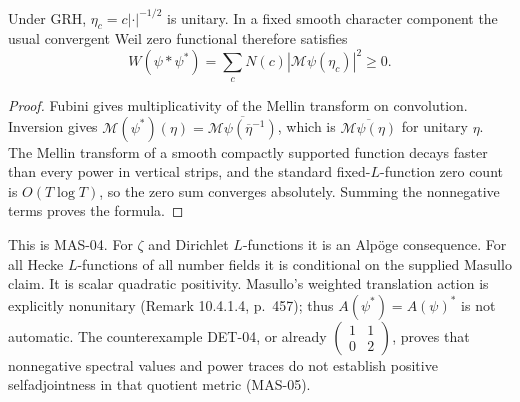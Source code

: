 \documentclass[11pt,a4paper]{article}
\newcommand{\M}{\mathcal M}
\newcommand{\fid}[1]{\textsf{#1}}
\begin{document}
Under GRH, $\eta_c=c|\cdot|^{-1/2}$ is unitary. In a fixed smooth character component the usual convergent Weil zero functional therefore satisfies
\begin{equation}\label{eq:weilsquares}
 W(\psi*\psi^*)=\sum_cN(c)|\M\psi(\eta_c)|^2\ge0.
\end{equation}
\begin{proof}
Fubini gives multiplicativity of the Mellin transform on convolution. Inversion gives
$\M(\psi^*)(\eta)=\overline{\M\psi(\overline\eta^{-1})}$, which is $\overline{\M\psi(\eta)}$ for unitary $\eta$. The Mellin transform of a smooth compactly supported function decays faster than every power in vertical strips, and the standard fixed-$L$-function zero count is $O(T\log T)$, so the zero sum converges absolutely. Summing the nonnegative terms proves the formula.
\end{proof}
This is \fid{MAS-04}. For $\zeta$ and Dirichlet $L$-functions it is an Alp\"oge consequence. For all Hecke $L$-functions of all number fields it is conditional on the supplied Masullo claim. It is scalar quadratic positivity. Masullo's weighted translation action is explicitly nonunitary (Remark 10.4.1.4, p.~457); thus $A(\psi^*)=A(\psi)^*$ is not automatic. The counterexample \fid{DET-04}, or already $\left(\begin{smallmatrix}1&1\\0&2\end{smallmatrix}\right)$, proves that nonnegative spectral values and power traces do not establish positive selfadjointness in that quotient metric (\fid{MAS-05}).
\end{document}
